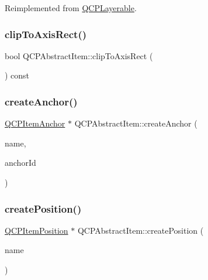 Reimplemented from \mbox{\hyperlink{class_q_c_p_layerable_acbcfc9ecc75433747b1978a77b1864b3}{Q\+C\+P\+Layerable}}.

\mbox{\label{class_q_c_p_abstract_item_a42715ad5f3d7fca6854025fa5636f436}} 
\subsubsection{\texorpdfstring{clipToAxisRect()}{clipToAxisRect()}}
{\footnotesize\ttfamily bool Q\+C\+P\+Abstract\+Item\+::clip\+To\+Axis\+Rect (\begin{DoxyParamCaption}{ }\end{DoxyParamCaption}) const\hspace{0.3cm}{\ttfamily [inline]}}

\mbox{\label{class_q_c_p_abstract_item_af3fc92527802078ca395138748b629a7}} 
\subsubsection{\texorpdfstring{createAnchor()}{createAnchor()}}
{\footnotesize\ttfamily \mbox{\hyperlink{class_q_c_p_item_anchor}{Q\+C\+P\+Item\+Anchor}} $\ast$ Q\+C\+P\+Abstract\+Item\+::create\+Anchor (\begin{DoxyParamCaption}\item[{const Q\+String \&}]{name,  }\item[{int}]{anchor\+Id }\end{DoxyParamCaption})\hspace{0.3cm}{\ttfamily [protected]}}

\mbox{\label{class_q_c_p_abstract_item_a75036d39c4d4e2e1a7dd145fff915d32}} 
\subsubsection{\texorpdfstring{createPosition()}{createPosition()}}
{\footnotesize\ttfamily \mbox{\hyperlink{class_q_c_p_item_position}{Q\+C\+P\+Item\+Position}} $\ast$ Q\+C\+P\+Abstract\+Item\+::create\+Position (\begin{DoxyParamCaption}\item[{const Q\+String \&}]{name }\end{DoxyParamCaption})\hspace{0.3cm}{\ttfamily [protected]}}

